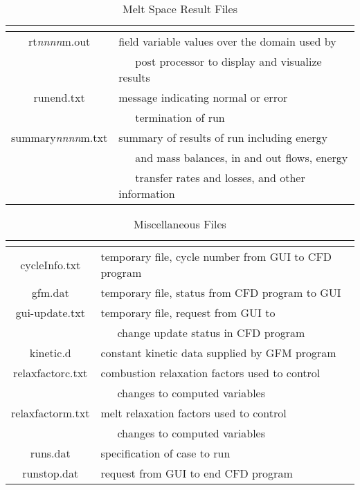 \documentclass[twoside,12pt]{article}
\newcommand{\var}[1]{\text{\it #1}}
\numberwithin{equation}{section}
\begin{document}
\begin{table}[!hbp]
\caption{Melt Space Result Files}
\label{result-files-melt}
\centering
\begin{tabular}{|c|l|}
\hline
\var{File Name} & \multicolumn{1}{|c|}{ \var{Explanation}} \\
\hline
rt\textit{nnnn}m.out  & field variable values over the domain used by \\
              & ~~~post processor to display and visualize results \\
runend.txt  & message indicating normal or error \\
            & ~~~termination of run \\
summary\textit{nnnn}m.txt  & summary of results of run including energy \\
                      & ~~~and mass balances, in and out flows, energy \\
                      & ~~~transfer rates and losses, and other information \\
\hline
\end{tabular}
\end{table}


\begin{table}[!hbp]
\caption{Miscellaneous Files}
\label{misc-files}
\centering
\begin{tabular}{|c|l|}
\hline
\var{File Name} & \multicolumn{1}{|c|}{ \var{Explanation}} \\
\hline
cycleInfo.txt  & temporary file, cycle number from GUI to CFD program \\
gfm.dat  & temporary file, status from CFD program to GUI \\
gui-update.txt  & temporary file, request from GUI to \\
                & ~~~change update status in CFD program \\
kinetic.d  & constant kinetic data supplied by GFM program \\
relaxfactorc.txt & combustion relaxation factors used to control \\
                 & ~~~changes to computed variables \\
relaxfactorm.txt & melt relaxation factors used to control \\
                 & ~~~changes to computed variables \\
runs.dat  & specification of case to run \\
runstop.dat  & request from GUI to end CFD program \\
\hline
\end{tabular}
\end{table}
\end{document}
